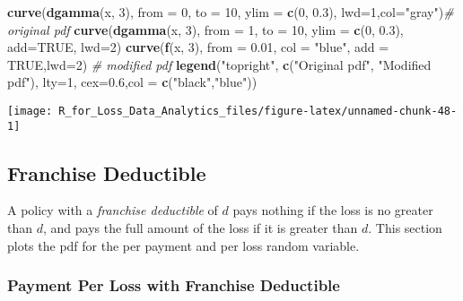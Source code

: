 \documentclass[]{book}
\newenvironment{Shaded}{\begin{snugshade}}{\end{snugshade}}
\newcommand{\KeywordTok}[1]{\textcolor[rgb]{0.13,0.29,0.53}{\textbf{#1}}}
\newcommand{\DataTypeTok}[1]{\textcolor[rgb]{0.13,0.29,0.53}{#1}}
\newcommand{\DecValTok}[1]{\textcolor[rgb]{0.00,0.00,0.81}{#1}}
\newcommand{\FloatTok}[1]{\textcolor[rgb]{0.00,0.00,0.81}{#1}}
\newcommand{\StringTok}[1]{\textcolor[rgb]{0.31,0.60,0.02}{#1}}
\newcommand{\CommentTok}[1]{\textcolor[rgb]{0.56,0.35,0.01}{\textit{#1}}}
\newcommand{\OtherTok}[1]{\textcolor[rgb]{0.56,0.35,0.01}{#1}}
\newcommand{\NormalTok}[1]{#1}
\theoremstyle{definition}
\theoremstyle{definition}
\theoremstyle{definition}
\theoremstyle{remark}
\begin{document}
\begin{Shaded}
\begin{Highlighting}[]
\KeywordTok{curve}\NormalTok{(}\KeywordTok{dgamma}\NormalTok{(x, }\DecValTok{3}\NormalTok{), }\DataTypeTok{from =} \DecValTok{0}\NormalTok{, }\DataTypeTok{to =} \DecValTok{10}\NormalTok{, }\DataTypeTok{ylim =} \KeywordTok{c}\NormalTok{(}\DecValTok{0}\NormalTok{, }\FloatTok{0.3}\NormalTok{), }\DataTypeTok{lwd=}\DecValTok{1}\NormalTok{,}\DataTypeTok{col=}\StringTok{"gray"}\NormalTok{)}\CommentTok{# original pdf}
\KeywordTok{curve}\NormalTok{(}\KeywordTok{dgamma}\NormalTok{(x, }\DecValTok{3}\NormalTok{), }\DataTypeTok{from =} \DecValTok{1}\NormalTok{, }\DataTypeTok{to =} \DecValTok{10}\NormalTok{, }\DataTypeTok{ylim =} \KeywordTok{c}\NormalTok{(}\DecValTok{0}\NormalTok{, }\FloatTok{0.3}\NormalTok{), }\DataTypeTok{add=}\OtherTok{TRUE}\NormalTok{, }\DataTypeTok{lwd=}\DecValTok{2}\NormalTok{)}
\KeywordTok{curve}\NormalTok{(}\KeywordTok{f}\NormalTok{(x, }\DecValTok{3}\NormalTok{), }\DataTypeTok{from =} \FloatTok{0.01}\NormalTok{, }\DataTypeTok{col =} \StringTok{"blue"}\NormalTok{, }\DataTypeTok{add =} \OtherTok{TRUE}\NormalTok{,}\DataTypeTok{lwd=}\DecValTok{2}\NormalTok{)     }\CommentTok{# modified pdf}
\KeywordTok{legend}\NormalTok{(}\StringTok{"topright"}\NormalTok{, }\KeywordTok{c}\NormalTok{(}\StringTok{"Original pdf"}\NormalTok{, }\StringTok{"Modified pdf"}\NormalTok{), }\DataTypeTok{lty=}\DecValTok{1}\NormalTok{, }\DataTypeTok{cex=}\FloatTok{0.6}\NormalTok{,}\DataTypeTok{col =} \KeywordTok{c}\NormalTok{(}\StringTok{"black"}\NormalTok{,}\StringTok{"blue"}\NormalTok{))}
\end{Highlighting}
\end{Shaded}

\begin{center}\texttt{[image: R\_for\_Loss\_Data\_Analytics\_files/figure-latex/unnamed-chunk-48-1]} \end{center}

\subsection{Franchise Deductible}\label{franchise-deductible}

A policy with a \emph{franchise deductible} of \(d\) pays nothing if the
loss is no greater than \(d\), and pays the full amount of the loss if
it is greater than \(d\). This section plots the pdf for the per payment
and per loss random variable.

\subsubsection{Payment Per Loss with Franchise
Deductible}\label{payment-per-loss-with-franchise-deductible}
\end{document}
